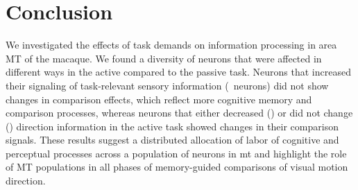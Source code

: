 \section*{\color{sectionBlue} Conclusion}
We investigated the effects of task demands on information processing in area MT of the macaque. We found a diversity of neurons that were affected in different ways in the active compared to the passive task. 
Neurons that increased their signaling of task-relevant sensory information (\enhanced\ neurons) did not show changes in comparison effects, which reflect more cognitive memory and comparison processes, whereas neurons that either decreased (\suppressed) or did not change (\consistent) direction information in the active task showed changes in their comparison signals.
These results suggest a distributed allocation of labor of cognitive and perceptual processes across a population of neurons in \gls{mt} and highlight the role of MT populations in all phases of memory-guided comparisons of visual motion direction.\label{rev:het4}


